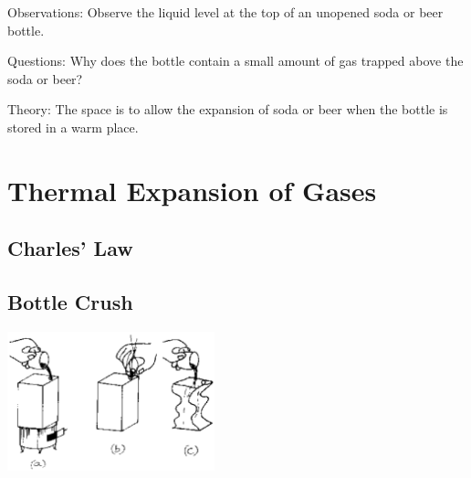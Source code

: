\begin{multicols}{2}
\begin{description*}
\item[Observations:]{Observe the liquid level at the top of an unopened soda or beer bottle.}
\item[Questions:]{Why does the bottle contain a small amount of gas trapped above the soda or beer?}
\item[Theory:]{The space is to allow the expansion of soda or beer when the bottle is stored in a warm place.}
\end{description*}


\section*{Thermal Expansion of Gases} 

\subsection*{Charles' Law} 

\subsection{Bottle Crush}

\begin{center}
\includegraphics[width=0.45\textwidth]{./img/source/bottle-crush.png}
\end{center}


\end{multicols}
